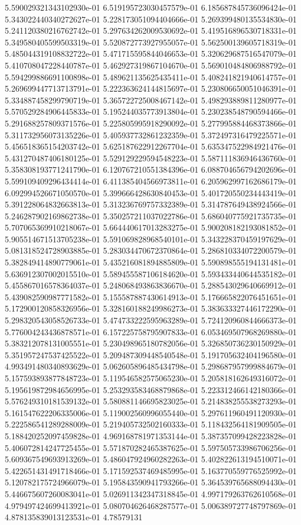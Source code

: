 	5.590029321343102930e-01	6.519195723030457579e-01	6.185687845736096424e-01	5.343022440340272627e-01	5.228173051094404666e-01	5.269399480135534830e-01	5.241120380216762742e-01	5.297634262009530692e-01	5.419516896530718331e-01	5.349580405599503319e-01	5.520872773927955057e-01	5.562500139605718319e-01	5.485044319108832722e-01	5.471715595844046653e-01	5.320629687516547079e-01	5.410708047228440787e-01	5.462927319867104670e-01	5.569010484806988792e-01	5.594299886691100898e-01	5.489621135625435411e-01	5.408241821940614757e-01	5.269699447713713791e-01	5.222363624144815697e-01	5.230806650051046391e-01	5.334887458299790719e-01	5.365722725008467142e-01	5.498293889811280977e-01	5.570529284906445833e-01	5.195244035773913804e-01	5.230238548790594466e-01	5.291688257809371576e-01	5.225805995918290092e-01	5.277995884468373866e-01	5.311732956073135226e-01	5.405937732861232359e-01	5.372497316479225571e-01	5.456518365154203742e-01	5.625187622912267704e-01	5.635347522984921476e-01	5.431270487406180125e-01	5.529129229594548223e-01	5.587111836946436760e-01	5.358308193771241790e-01	6.120767210551384396e-01	6.088704656794202696e-01	5.599109409296434414e-01	6.411385404566973811e-01	6.205962997162686179e-01	6.092994526671050570e-01	5.399666428630840453e-01	5.401720550234443419e-01	5.391228064832663813e-01	5.313236769757332389e-01	5.314787649438924566e-01	5.246287902169862738e-01	5.350257211037022786e-01	5.686040775921735735e-01	5.707065369910218067e-01	5.664440617013283275e-01	5.900208182193081852e-01	5.905514671513705238e-01	5.591069828968540101e-01	5.343228370459197629e-01	5.081318524728903885e-01	5.283034470672370864e-01	5.286810334072200579e-01	5.382849414890779061e-01	5.435216081894885809e-01	5.590898555194131481e-01	5.636912307002015510e-01	5.589455587106184620e-01	5.593433440644535182e-01	5.455867016578364037e-01	5.248068493863836670e-01	5.288543029640669912e-01	5.439082590987771582e-01	5.155587887430614913e-01	5.176665822076451651e-01	5.172900120858326956e-01	5.328160188249986273e-01	5.383633327446172290e-01	5.298320543058526733e-01	5.474733222595963289e-01	5.724120960844666373e-01	5.776004243436878571e-01	6.157225758795907833e-01	6.053469507968269880e-01	5.383212078131005551e-01	5.230498965180782056e-01	5.326850736230150929e-01	5.351957247537425522e-01	5.209487309448540548e-01	5.191705632404196580e-01	4.993491480340893629e-01	5.062605896485434798e-01	5.298687957999884679e-01	5.157593893877848723e-01	5.119546582575065230e-01	5.205818162649316072e-01	5.195619872984656995e-01	5.253293583468879868e-01	5.223312466142180366e-01	5.576249310181539132e-01	5.580881146695823025e-01	5.214838255538273293e-01	5.161547622206335006e-01	5.119002560996055440e-01	5.297611960491120930e-01	5.222586541289288009e-01	5.219405732502160333e-01	5.118432564181909505e-01	5.188420252097459828e-01	4.969168781971353144e-01	5.387357099428223828e-01	5.406072814247725455e-01	5.571870282465387625e-01	5.597505733986706256e-01	5.609367549693913269e-01	5.486047924960282263e-01	5.402822613194510071e-01	5.422651431491718466e-01	5.171592537469485995e-01	5.163770559776525992e-01	5.120782175724966079e-01	5.195843590941793266e-01	5.364539765688094430e-01	5.446675607260083041e-01	5.026911342347318845e-01	4.997179263762610568e-01	4.979497424699413921e-01	5.080704626468287577e-01	5.006389727748797869e-01	4.878135839013123531e-01	4.78579131